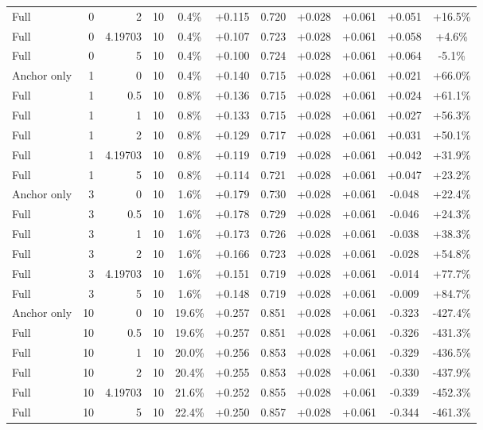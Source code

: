 \begin{table}[htbp]
\begin{tabular}{lrrrccccccc}
Full & 0 & 2 & 10 & 0.4\% & +0.115 & 0.720 & +0.028 & +0.061 & +0.051 & +16.5\% \\
Full & 0 & 4.19703 & 10 & 0.4\% & +0.107 & 0.723 & +0.028 & +0.061 & +0.058 & +4.6\% \\
Full & 0 & 5 & 10 & 0.4\% & +0.100 & 0.724 & +0.028 & +0.061 & +0.064 & -5.1\% \\
Anchor only & 1 & 0 & 10 & 0.4\% & +0.140 & 0.715 & +0.028 & +0.061 & +0.021 & +66.0\% \\
Full & 1 & 0.5 & 10 & 0.8\% & +0.136 & 0.715 & +0.028 & +0.061 & +0.024 & +61.1\% \\
Full & 1 & 1 & 10 & 0.8\% & +0.133 & 0.715 & +0.028 & +0.061 & +0.027 & +56.3\% \\
Full & 1 & 2 & 10 & 0.8\% & +0.129 & 0.717 & +0.028 & +0.061 & +0.031 & +50.1\% \\
Full & 1 & 4.19703 & 10 & 0.8\% & +0.119 & 0.719 & +0.028 & +0.061 & +0.042 & +31.9\% \\
Full & 1 & 5 & 10 & 0.8\% & +0.114 & 0.721 & +0.028 & +0.061 & +0.047 & +23.2\% \\
Anchor only & 3 & 0 & 10 & 1.6\% & +0.179 & 0.730 & +0.028 & +0.061 & -0.048 & +22.4\% \\
Full & 3 & 0.5 & 10 & 1.6\% & +0.178 & 0.729 & +0.028 & +0.061 & -0.046 & +24.3\% \\
Full & 3 & 1 & 10 & 1.6\% & +0.173 & 0.726 & +0.028 & +0.061 & -0.038 & +38.3\% \\
Full & 3 & 2 & 10 & 1.6\% & +0.166 & 0.723 & +0.028 & +0.061 & -0.028 & +54.8\% \\
Full & 3 & 4.19703 & 10 & 1.6\% & +0.151 & 0.719 & +0.028 & +0.061 & -0.014 & +77.7\% \\
Full & 3 & 5 & 10 & 1.6\% & +0.148 & 0.719 & +0.028 & +0.061 & -0.009 & +84.7\% \\
Anchor only & 10 & 0 & 10 & 19.6\% & +0.257 & 0.851 & +0.028 & +0.061 & -0.323 & -427.4\% \\
Full & 10 & 0.5 & 10 & 19.6\% & +0.257 & 0.851 & +0.028 & +0.061 & -0.326 & -431.3\% \\
Full & 10 & 1 & 10 & 20.0\% & +0.256 & 0.853 & +0.028 & +0.061 & -0.329 & -436.5\% \\
Full & 10 & 2 & 10 & 20.4\% & +0.255 & 0.853 & +0.028 & +0.061 & -0.330 & -437.9\% \\
Full & 10 & 4.19703 & 10 & 21.6\% & +0.252 & 0.855 & +0.028 & +0.061 & -0.339 & -452.3\% \\
Full & 10 & 5 & 10 & 22.4\% & +0.250 & 0.857 & +0.028 & +0.061 & -0.344 & -461.3\% \\

\end{tabular}
\end{table}
